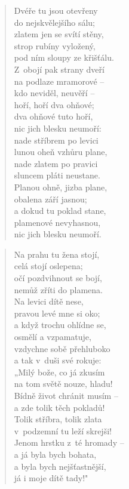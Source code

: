 \begin{verse}
Dvéře tu jsou otevřeny \\
do nejskvělejšího sálu; \\
zlatem jen se svítí stěny, \\
strop rubíny vyložený, \\
pod ním sloupy ze křišťálu. \\
Z~obojí pak strany dveří \\
na podlaze mramorové -- \\
kdo neviděl, neuvěří -- \\
hoří, hoří dva ohňové; \\
dva ohňové tuto hoří, \\
nic jich blesku neumoří: \\
nade stříbrem po levici \\
lunou oheň vzhůru plane, \\
nade zlatem po pravici \\
sluncem pláti neustane. \\
Planou ohně, jizba plane, \\
obalena září jasnou; \\
a dokud tu poklad stane, \\
plamenové nevyhasnou, \\
nic jich blesku neumoří.
\end{verse}

\begin{verse}
Na prahu tu žena stojí, \\
celá stojí oslepena; \\
očí pozdvihnout se bojí, \\
nemůž zříti do plamena. \\
Na levici dítě nese, \\
pravou levé mne si oko; \\
a když trochu ohlídne se, \\
osmělí a vzpamatuje, \\
vzdychne sobě přehluboko \\
a tak v~duši své rokuje: \\
„Milý bože, co já zkusím \\
na tom světě nouze, hladu! \\
Bídně život chránit musím -- \\
a zde tolik těch pokladů! \\
Tolik stříbra, tolik zlata \\
v~podzemní tu leží skrejši! \\
Jenom hrstku z~té hromady -- \\
a já byla bych bohata, \\
a byla bych nejšťastnější, \\
já i moje dítě tady!"
\end{verse}


